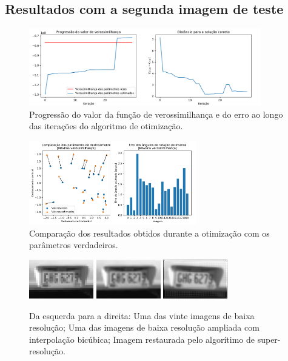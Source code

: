 \subsection{Resultados com a segunda imagem de teste}
\begin{figure}[h]
	\centering
	\caption{\label{fig:progression} Progressão do valor da função de verossimilhança e do erro ao longo das iterações do algoritmo de otimização.}
	\includegraphics[width=0.90\textwidth]{./figures/results_figures/progression_plot2.pdf}
\end{figure}

\begin{figure}[h]
	\centering
	\caption{\label{fig:comparisson} Comparação dos resultados obtidos durante a otimização com os parâmetros verdadeiros.}
	\includegraphics[width=0.65\textwidth]{./figures/results_figures/comparisson_plot2.pdf}
	
\end{figure}

\begin{figure}[h]
	\centering
	\caption{\label{fig:sr_comparisson} Da esquerda para a direita: Uma das vinte imagens de baixa resolução;
	Uma das imagens de baixa resolução ampliada com interpolação bicúbica;
	Imagem restaurada pelo algorítimo de super-resolução.}
	\includegraphics[width=0.25\textwidth]{./figures/results_figures/resized_nearest2.png}
	\includegraphics[width=0.25\textwidth]{./figures/results_figures/resized_bicubic2.png}
	\includegraphics[width=0.25\textwidth]{./figures/results_figures/restored_image_sr2.png}
\end{figure}

